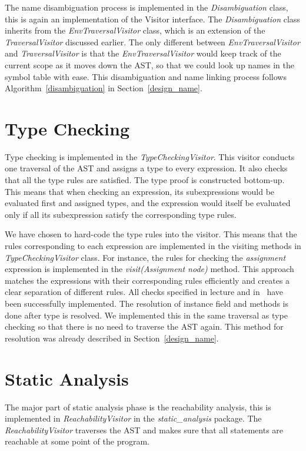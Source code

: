 \documentclass[a4paper, notitlepage]{report}
\begin{document}
The name disambiguation process is implemented in the \emph{Disambiguation} class, this is again an implementation of the Visitor interface. The \emph{Disambiguation} class inherits from the \emph{EnvTraversalVisitor} class, which is an extension of the \emph{TraversalVisitor} discussed earlier. The only different between \emph{EnvTraversalVisitor} and \emph{TraversalVisitor} is that the \emph{EnvTraversalVisitor} would keep track of the current scope as it moves down the AST, so that we could look up names in the symbol table with ease. This disambiguation and name linking process follows Algorithm~\ref{disambiguation} in Section~\ref{design_name}.

\section{Type Checking}


Type checking is implemented in the \emph{TypeCheckingVisitor}. This visitor conducts one traversal of the AST and assigns a type to every expression. It also checks that all the type rules are satisfied. The type proof is constructed bottom-up. This means that when checking an expression, its subexpressions would be evaluated first and assigned types, and the expression would itself be evaluated only if all its subexpression satisfy the corresponding type rules.

We have chosen to hard-code the type rules into the visitor. This means that the rules corresponding to each expression are implemented in the visiting methods in \emph{TypeCheckingVisitor} class. For instance, the rules for checking the \emph{assignment} expression is implemented in the \emph{visit(Assignment node)} method. This approach matches the expressions with their corresponding rules efficiently and creates a clear separation of different rules. All checks specified in lecture and in~\cite{a3} have been successfully implemented. The resolution of instance field and methods is done after type is resolved. We implemented this in the same traversal as type checking so that there is no need to traverse the AST again. This method for resolution was already described in Section~\ref{design_name}.

\section{Static Analysis}

The major part of static analysis phase is the reachability analysis, this is implemented in \emph{ReachabilityVisitor} in the \emph{static\_analysis} package. The \emph{ReachabilityVisitor} traverses the AST and makes sure that all statements are reachable at some point of the program.
\end{document}

